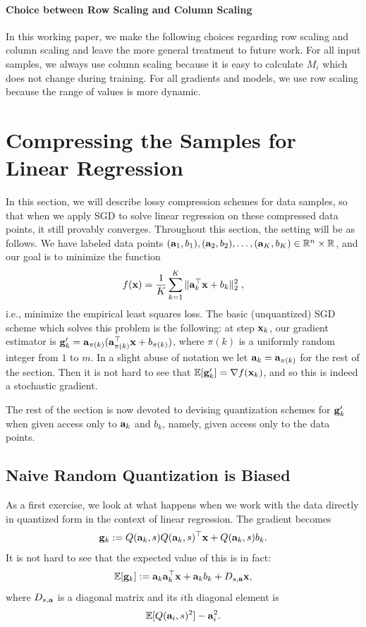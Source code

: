 \documentclass{article}
\newcommand{\R}{\mathbb{R}}
\def\a{{\bf a}}
\def\g{{\bf g}}
\def\x{{\bf x}}
\def\E{\mathbb{E}}
\begin{document}
\paragraph*{Choice between Row Scaling and Column Scaling}

In this working paper, we make the following choices regarding row scaling
and column scaling and leave the more general treatment to future work.
For all input samples, we always use column scaling because it is easy
to calculate $M_i$ which does not change during training. For all gradients
and models, we use row scaling because the range of values is more dynamic.

\section{Compressing the Samples for Linear Regression}

In this section, we will describe lossy compression schemes for data samples, so that when we apply SGD to solve linear regression on these compressed data points, it still provably converges.
Throughout this section, the setting will be as follows.
We have labeled data points $(\a_1, b_1), (\a_2, b_2), \ldots, (\a_K, b_K) \in \R^n \times \R$, and our goal is to minimize the function
\[
f(\x) = \frac{1}{K} \sum_{k = 1}^K \| \a_k^\top \x + b_k \|_2^2 \; ,
\]
i.e., minimize the empirical least squares loss.
The basic (unquantized) SGD scheme which solves this problem is the following: at step $\x_k$, our gradient estimator is $\g'_k = \a_{\pi(k)} (\a_{\pi(k)}^\top \x + b_{\pi(k)})$, where $\pi(k)$ is a uniformly random integer from $1$ to $m$.
In a slight abuse of notation we let $\a_k = \a_{\pi(k)}$ for the rest of the section.
Then it is not hard to see that $\E [\g'_k] = \nabla f(\x_k)$, and so this is indeed a stochastic gradient.

The rest of the section is now devoted to devising quantization schemes for $\g'_k$ when given access only to $\a_k$ and $b_k$, namely, given access only to the data points.

\subsection{Naive Random Quantization is Biased}

As a first exercise, we look at what happens when we work with the data directly in quantized form in the context of linear regression. 
The gradient becomes
\[
\g_k := Q(\a_k, s ) Q(\a_k, s)^\top \x + Q(\a_k, s) b_k.
\]
It is not hard to see that the expected value of this is in fact: 
\[
\E[\g_k] := \a_k \a_k^\top \x + \a_k b_k + D_{s, \a} \x, 
\]
where $D_{s, \a}$ is a diagonal matrix and its $i$th diagonal element is 
\[
\E[ Q(\a_i, s)^2 ] - \a_i^2.
\]
\end{document}
